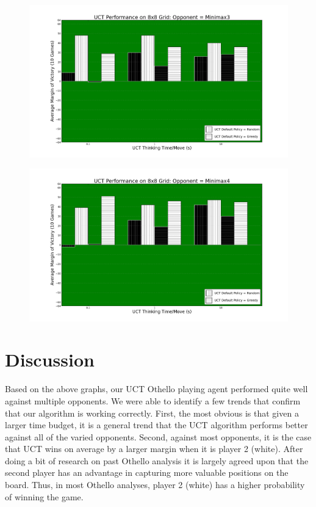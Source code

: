 \documentclass[12pt,letterpaper]{article}
\begin{document}
\begin{figure}[!hp]
\begin{center}
\includegraphics[scale=.4]{88_Minimax3}
\end{center}
\end{figure}

\begin{figure}[!h]
\begin{center}
\includegraphics[scale=.4]{88_Minimax4}
\end{center}
\end{figure}

\pagebreak
\section{Discussion}
\label{disc}
Based on the above graphs, our UCT Othello playing agent performed quite well against multiple opponents. We were able to identify a few trends that confirm that our algorithm is working correctly.  First, the most obvious is that given a larger time budget, it is a general trend that the UCT algorithm performs better against all of the varied opponents. Second, against most opponents, it is the case that UCT wins on average by a larger margin when it is player 2 (white). After doing a bit of research on past Othello analysis it is largely agreed upon that the second player has an advantage in capturing more valuable positions on the board. Thus, in most Othello analyses, player 2 (white) has a higher probability of winning the game. 
\end{document}
